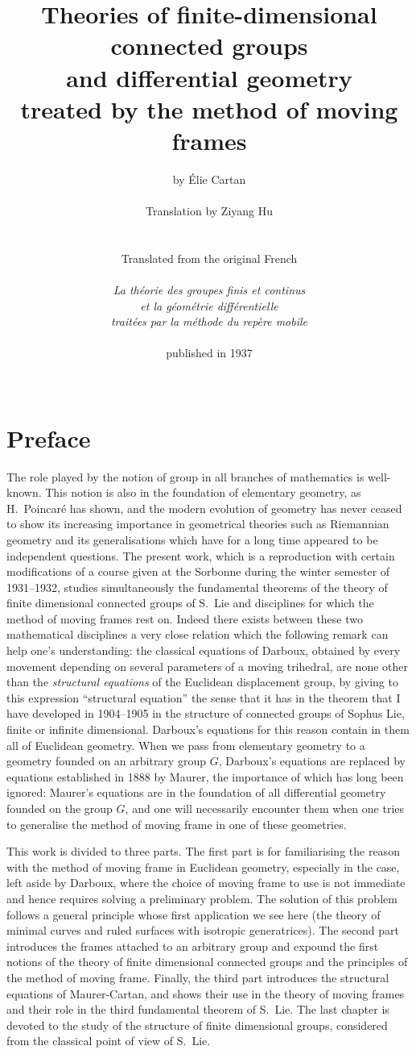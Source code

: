 \documentclass[leqno,11pt]{book}
\title{Theories of finite-dimensional connected groups\\
and differential geometry\\
treated by the method of moving frames}
\author{by Élie Cartan\\
\\
Translation by Ziyang Hu\\
\\
\\
Translated from the original French\\
\\
\emph{La théorie des groupes finis et continus}\\ 
\emph{et la géométrie différentielle}\\
\emph{traitées par la méthode du repère mobile}\\
\\
published in 1937\\\\}
\numberwithin{equation}{chapter}
\theoremstyle{shape1}
\theoremstyle{shapesmall}
\begin{document}
\maketitle

\chapter*{Preface}

The role played by the notion of group in all branches of mathematics is well-known. This notion is also in the foundation of elementary geometry, as H.~Poincaré has shown, and the modern evolution of geometry has never ceased to show its increasing importance in geometrical theories such as Riemannian geometry and its generalisations which have for a long time appeared to be independent questions. The present work, which is a reproduction with certain modifications of a course given at the Sorbonne during the winter semester of 1931--1932, studies simultaneously the fundamental theorems of the theory of finite dimensional connected groups of S.~Lie and disciplines for which the method of moving frames rest on. Indeed there exists between these two mathematical disciplines a very close relation which the following remark can help one's understanding: the classical equations of Darboux, obtained by every movement depending on several parameters of a moving trihedral, are none other than the \emph{structural equations} of the Euclidean displacement group, by giving to this expression ``structural equation'' the sense that it has in the theorem that I have developed in 1904--1905 in the structure of connected groups of Sophus Lie, finite or infinite dimensional. Darboux's equations for this reason contain in them all of Euclidean geometry. When we pass from elementary geometry to a geometry founded on an arbitrary group $G$, Darboux's equations are replaced by equations established in 1888 by Maurer, the importance of which has long been ignored: Maurer's equations are in the foundation of all differential geometry founded on the group $G$, and one will necessarily encounter them when one tries to generalise the method of moving frame in one of these geometries.

This work is divided to three parts. The first part is for familiarising the reason with the method of moving frame in Euclidean geometry, especially in the case, left aside by Darboux, where the choice of moving frame to use is not immediate and hence requires solving a preliminary problem. The solution of this problem follows a general principle whose first application we see here (the theory of minimal curves and ruled surfaces with isotropic generatrices). The second part introduces the frames attached to an arbitrary group and expound the first notions of the theory of finite dimensional connected groups and the principles of the method of moving frame. Finally, the third part introduces the structural equations of Maurer-Cartan, and shows their use in the theory of moving frames and their role in the third fundamental theorem of S.~Lie. The last chapter is devoted to the study of the structure of finite dimensional groups, considered from the classical point of view of S.~Lie.
\end{document}
